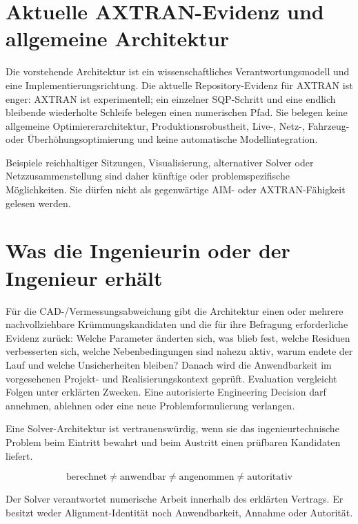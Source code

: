 \section{Aktuelle AXTRAN-Evidenz und allgemeine Architektur}

Die vorstehende Architektur ist ein wissenschaftliches
Verantwortungsmodell und eine Implementierungsrichtung. Die aktuelle
Repository-Evidenz für AXTRAN ist enger: AXTRAN ist experimentell; ein
einzelner SQP-Schritt und eine endlich bleibende wiederholte Schleife belegen
einen numerischen Pfad. Sie belegen keine allgemeine Optimiererarchitektur,
Produktionsrobustheit, Live-, Netz-, Fahrzeug- oder
Überhöhungsoptimierung und keine automatische Modellintegration.

Beispiele reichhaltiger Sitzungen, Visualisierung, alternativer Solver oder
Netzzusammenstellung sind daher künftige oder problemspezifische
Möglichkeiten. Sie dürfen nicht als gegenwärtige AIM- oder AXTRAN-Fähigkeit
gelesen werden.

\section{Was die Ingenieurin oder der Ingenieur erhält}

Für die CAD-/Vermessungsabweichung gibt die Architektur einen oder mehrere
nachvollziehbare Krümmungskandidaten und die für ihre Befragung erforderliche
Evidenz zurück: Welche Parameter änderten sich, was blieb fest, welche
Residuen verbesserten sich, welche Nebenbedingungen sind nahezu aktiv, warum
endete der Lauf und welche Unsicherheiten bleiben? Danach wird die
Anwendbarkeit im vorgesehenen Projekt- und Realisierungskontext geprüft.
Evaluation vergleicht Folgen unter erklärten Zwecken. Eine autorisierte
Engineering Decision darf annehmen, ablehnen oder eine neue
Problemformulierung verlangen.

\begin{summary}
Eine Solver-Architektur ist vertrauenswürdig, wenn sie das
ingenieurtechnische Problem beim Eintritt bewahrt und beim Austritt einen
prüfbaren Kandidaten liefert.

\[
\boxed{\text{berechnet}\neq\text{anwendbar}\neq
\text{angenommen}\neq\text{autoritativ}}
\]

Der Solver verantwortet numerische Arbeit innerhalb des erklärten Vertrags.
Er besitzt weder Alignment-Identität noch Anwendbarkeit, Annahme oder
Autorität.
\end{summary}
